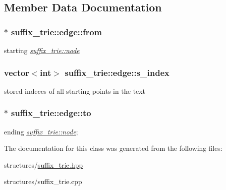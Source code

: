 \subsection{Member Data Documentation}
\hypertarget{classsuffix__trie_1_1edge_ae89e6815dd581516c8d4284814334263}{
\subsubsection[{from}]{$\ast$ suffix\+\_\+trie\+::edge\+::from}}\label{classsuffix__trie_1_1edge_ae89e6815dd581516c8d4284814334263}
starting {\itshape \hyperlink{classsuffix__trie_1_1node}{suffix\+\_\+trie\+::node}} \hypertarget{classsuffix__trie_1_1edge_ac5864e7428c08ec02d50039a5dd4eaa6}{
\subsubsection[{s\+\_\+index}]{\setlength{\rightskip}{0pt plus 5cm}vector$<$int$>$ suffix\+\_\+trie\+::edge\+::s\+\_\+index}}\label{classsuffix__trie_1_1edge_ac5864e7428c08ec02d50039a5dd4eaa6}
stored indeces of all starting points in the text \hypertarget{classsuffix__trie_1_1edge_a356e813f739d3559b031bdcb6da6da76}{
\subsubsection[{to}]{$\ast$ suffix\+\_\+trie\+::edge\+::to}}\label{classsuffix__trie_1_1edge_a356e813f739d3559b031bdcb6da6da76}
ending {\itshape \hyperlink{classsuffix__trie_1_1node}{suffix\+\_\+trie\+::node}}; 

The documentation for this class was generated from the following files\+:\begin{DoxyCompactItemize}
\item 
structures/\hyperlink{suffix__trie_8hpp}{suffix\+\_\+trie.\+hpp}\item 
structures/suffix\+\_\+trie.\+cpp\end{DoxyCompactItemize}
